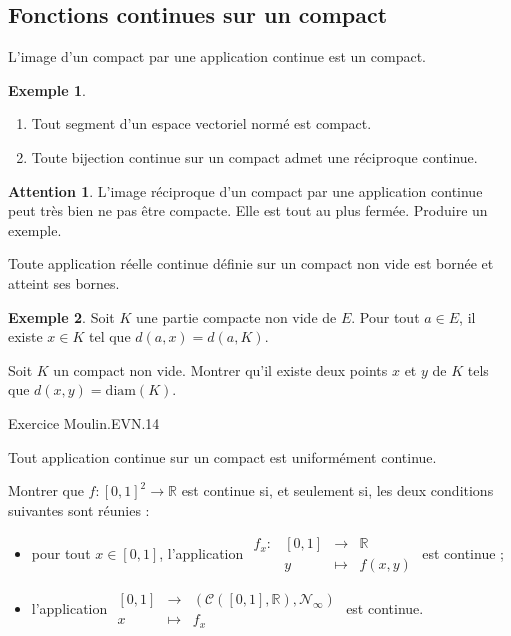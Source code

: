 \documentclass[french]{article}
\newcommand{\R}{\mathbb{R}}
\theoremstyle{plain}
\theoremstyle{definition}
\newtheorem*{ex}{Exemple}
\newtheorem*{attention}{Attention}
\theoremstyle{remark}
\begin{document}
\subsection{Fonctions continues sur un compact}

\begin{prop}%
	L'image d'un compact par une application continue est un compact.
\end{prop}

\begin{ex}
	\begin{enumerate}
		\item Tout segment d'un espace vectoriel normé est compact.
		\item Toute bijection continue sur un compact admet une réciproque continue.
	\end{enumerate}
\end{ex}

\begin{attention}
	L'image réciproque d'un compact par une application continue peut très bien ne pas être compacte. Elle est tout au plus fermée. Produire un exemple.
\end{attention}

\begin{thm}%
	Toute application réelle continue définie sur un compact non vide est bornée et atteint ses bornes.
\end{thm}

\begin{ex}
	Soit $K$ une partie compacte non vide de $E$. Pour tout $a\in E$, il existe $x\in K$ tel que $d(a,x)=d(a,K)$.
\end{ex}

\begin{exo}
	Soit $K$ un compact non vide. Montrer qu'il existe deux points $x$ et $y$ de $K$ tels que $d(x,y)=\text{diam}(K)$.
\end{exo}

Exercice Moulin.EVN.14

\begin{thm}%
	Tout application continue sur un compact est uniformément continue.
\end{thm}

\begin{exo}
	Montrer que $f:[0,1]^2\to\R$ est continue si, et seulement si, les deux conditions suivantes sont réunies :
	\begin{itemize}
		\item pour tout $x\in[0,1]$, l'application $\begin{array}{lrcl}
			f_x:&[0,1]&\longrightarrow&\R\\
			&y&\longmapsto&f(x,y)
		\end{array}$ est continue ;
		\item l'application $\begin{array}{lrcl}
			[0,1]&\longrightarrow&(\mathcal{C}([0,1],\R),\mathcal{N}_\infty)\\
			x&\longmapsto&f_x
		\end{array}$ est continue.
	\end{itemize}
\end{exo}
\end{document}

